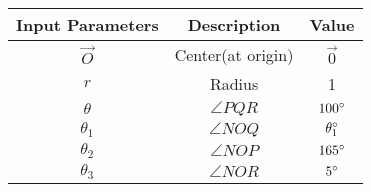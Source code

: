     \begin{tabular}{|c|c|c|}
    \hline
    \textbf{Input Parameters} &\textbf{Description} &\textbf{Value} \\
    \hline
     $\vec{O}$& Center(at origin)&$\vec{0}$\\
     \hline
 $r$ & Radius &1\\
 \hline
 $\theta$&$\angle PQR$&$100\degree$\\
 \hline
 $\theta_1$&$\angle NOQ $&$\theta_1\degree$\\
 \hline
 $\theta_2$&$\angle NOP $&$165\degree$\\
 \hline
 $\theta_3$&$\angle NOR $&$5\degree$\\
 \hline
  \end{tabular}
